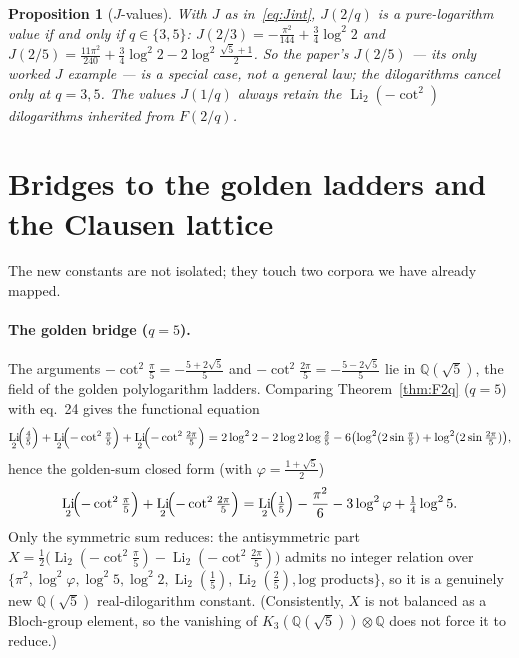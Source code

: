 \documentclass[11pt]{article}
\DeclareMathOperator{\Li}{Li}
\theoremstyle{plain}\newtheorem{theorem}{Theorem}\newtheorem{proposition}[theorem]{Proposition}
\theoremstyle{remark}\newtheorem{remark}[theorem]{Remark}
\begin{document}
\begin{proposition}[$J$-values]\label{prop:J}
With $J$ as in~\eqref{eq:Jint}, $J(2/q)$ is a pure-logarithm value if and only if $q\in\{3,5\}$:
$J(2/3)=-\tfrac{\pi^2}{144}+\tfrac34\log^2 2$ and
$J(2/5)=\tfrac{11\pi^2}{240}+\tfrac34\log^2 2-2\log^2\tfrac{\sqrt5+1}2$. So the paper's $J(2/5)$ --- its only
worked $J$ example --- is a special case, not a general law; the dilogarithms cancel only at $q=3,5$. The
values $J(1/q)$ always retain the $\Li_2(-\cot^2)$ dilogarithms inherited from $F(2/q)$.
\end{proposition}

\section{Bridges to the golden ladders and the Clausen lattice}\label{sec:bridges}
The new constants are not isolated; they touch two corpora we have already mapped.

\paragraph{The golden bridge ($q=5$).} The arguments $-\cot^2\tfrac\pi5=-\tfrac{5+2\sqrt5}5$ and
$-\cot^2\tfrac{2\pi}5=-\tfrac{5-2\sqrt5}5$ lie in $\mathbb Q(\sqrt5)$, the field of the golden polylogarithm
ladders. Comparing Theorem~\ref{thm:F2q} ($q=5$) with eq.~24 gives the functional equation
\[
  \Li_2\!\Bigl(\tfrac45\Bigr)+\Li_2\!\Bigl(-\cot^2\tfrac{\pi}{5}\Bigr)+\Li_2\!\Bigl(-\cot^2\tfrac{2\pi}{5}\Bigr)
  =2\log^2 2-2\log2\log\tfrac25-6\bigl(\log^2(2\sin\tfrac\pi5)+\log^2(2\sin\tfrac{2\pi}5)\bigr),
\]
hence the golden-sum closed form (with $\varphi=\tfrac{1+\sqrt5}2$)
\[
  \Li_2\!\Bigl(-\cot^2\tfrac{\pi}{5}\Bigr)+\Li_2\!\Bigl(-\cot^2\tfrac{2\pi}{5}\Bigr)
  =\Li_2\!\Bigl(\tfrac15\Bigr)-\frac{\pi^2}{6}-3\log^2\varphi+\tfrac14\log^2 5 .
\]
Only the symmetric sum reduces: the antisymmetric part
$X=\tfrac12\bigl(\Li_2(-\cot^2\tfrac\pi5)-\Li_2(-\cot^2\tfrac{2\pi}5)\bigr)$ admits no integer relation over
$\{\pi^2,\log^2\varphi,\log^2 5,\log^2 2,\Li_2(\tfrac15),\Li_2(\tfrac25),\text{log products}\}$, so it is a
genuinely new $\mathbb Q(\sqrt5)$ real-dilogarithm constant. (Consistently, $X$ is not balanced as a
Bloch-group element, so the vanishing of $K_3(\mathbb Q(\sqrt5))\otimes\mathbb Q$ does not force it to reduce.)
\end{document}
